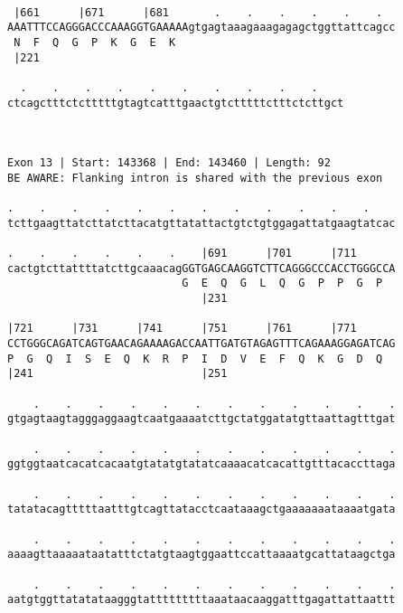 \documentclass{article}
\begin{document}
\begin{Verbatim}
  
 |661      |671      |681       .    .    .    .    .    .  
AAATTTCCAGGGACCCAAAGGTGAAAAAgtgagtaaagaaagagagctggttattcagcc
 N  F  Q  G  P  K  G  E  K                                  
 |221                                                       
  
  .    .    .    .    .    .    .    .    .    .    
ctcagctttctctttttgtagtcatttgaactgtctttttctttctcttgct
                                                    
                                                    
 
Exon 13 | Start: 143368 | End: 143460 | Length: 92
BE AWARE: Flanking intron is shared with the previous exon
 
.    .    .    .    .    .    .    .    .    .    .    .    
tcttgaagttatcttatcttacatgttatattactgtctgtggagattatgaagtatcac
                                                            
.    .    .    .    .    .    |691      |701      |711      
cactgtcttattttatcttgcaaacagGGTGAGCAAGGTCTTCAGGGCCCACCTGGGCCA
                           G  E  Q  G  L  Q  G  P  P  G  P  
                              |231                          
  
|721      |731      |741      |751      |761      |771      
CCTGGGCAGATCAGTGAACAGAAAAGACCAATTGATGTAGAGTTTCAGAAAGGAGATCAG
P  G  Q  I  S  E  Q  K  R  P  I  D  V  E  F  Q  K  G  D  Q  
|241                          |251                          
  
    .    .    .    .    .    .    .    .    .    .    .    .
gtgagtaagtagggaggaagtcaatgaaaatcttgctatggatatgttaattagtttgat
                                                            
    .    .    .    .    .    .    .    .    .    .    .    .
ggtggtaatcacatcacaatgtatatgtatatcaaaacatcacattgtttacaccttaga
                                                            
    .    .    .    .    .    .    .    .    .    .    .    .
tatatacagtttttaatttgtcagttatacctcaataaagctgaaaaaaataaaatgata
                                                            
    .    .    .    .    .    .    .    .    .    .    .    .
aaaagttaaaaataatatttctatgtaagtggaattccattaaaatgcattataagctga
                                                            
    .    .    .    .    .    .    .    .    .    .    .    .
aatgtggttatatataagggtatttttttttaaataacaaggatttgagattattaattt
                                                            

\end{Verbatim}
\end{document}
